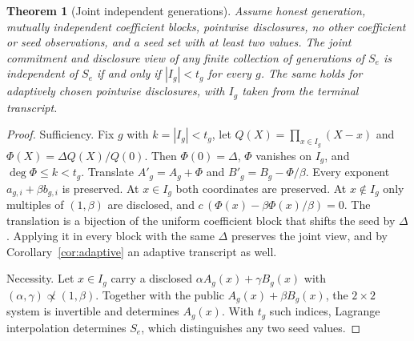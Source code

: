 \documentclass[pdflatex,sn-mathphys-num]{sn-jnl}%
\theoremstyle{plain}
\newtheorem{theorem}{Theorem}
\theoremstyle{definition}
\begin{document}
\begin{keyresult}
\begin{theorem}[Joint independent generations]\label{thm:generations}
Assume honest generation, mutually independent coefficient blocks, pointwise disclosures, no other coefficient or seed observations, and a seed set with at least two values. The joint commitment and disclosure view of any finite collection of generations of $S_e$ is independent of $S_e$ if and only if $|I_g|<t_g$ for every $g$. The same holds for adaptively chosen pointwise disclosures, with $I_g$ taken from the terminal transcript.
\end{theorem}
\end{keyresult}
\begin{proof}
Sufficiency. Fix $g$ with $k=|I_g|<t_g$, let $Q(X)=\prod_{x\in I_g}(X-x)$ and $\Phi(X)=\Delta Q(X)/Q(0)$. Then $\Phi(0)=\Delta$, $\Phi$ vanishes on $I_g$, and $\deg\Phi\le k<t_g$. Translate $A'_g=A_g+\Phi$ and $B'_g=B_g-\Phi/\beta$. Every exponent $a_{g,i}+\beta b_{g,i}$ is preserved. At $x\in I_g$ both coordinates are preserved. At $x\notin I_g$ only multiples of $(1,\beta)$ are disclosed, and $c\,(\Phi(x)-\beta\Phi(x)/\beta)=0$. The translation is a bijection of the uniform coefficient block that shifts the seed by $\Delta$. Applying it in every block with the same $\Delta$ preserves the joint view, and by Corollary~\ref{cor:adaptive} an adaptive transcript as well.

Necessity. Let $x\in I_g$ carry a disclosed $\alpha A_g(x)+\gamma B_g(x)$ with $(\alpha,\gamma)\not\propto(1,\beta)$. Together with the public $A_g(x)+\beta B_g(x)$, the $2\times2$ system is invertible and determines $A_g(x)$. With $t_g$ such indices, Lagrange interpolation determines $S_e$, which distinguishes any two seed values.
\end{proof}
\end{document}
